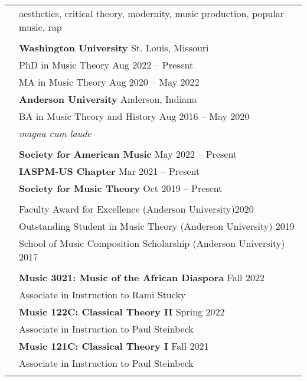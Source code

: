\documentclass[letterpaper, 11pt]{article}
\begin{document}
\begin{longtable}{p{1.3in}p{4.8in}}

\nohyphens{\color{OliveGreen}{Research interests}}
& aesthetics, critical theory, modernity, music production, popular music, rap \\
& \\

\color{OliveGreen}{Education} 
& \textbf{Washington University} \hfill St. Louis, Missouri \\
& PhD in Music Theory \hfill Aug 2022 -- Present \\
& MA in Music Theory \hfill Aug 2020 -- May 2022\\

& \textbf{Anderson University} \hfill Anderson, Indiana \\
& BA in Music Theory and History \hfill Aug 2016 -- May 2020 \\
& {\it magna cum laude}\\
&\\

{\color{OliveGreen}{Memberships}} 
& \textbf{Society for American Music} \hfill May 2022 -- Present \\
& \textbf{IASPM-US Chapter} \hfill Mar 2021 -- Present \\
& \textbf{Society for Music Theory} \hfill Oct 2019 -- Present \\
& \\

{\color{OliveGreen}{Honors \&}}
& Faculty Award for Excellence (Anderson University)\hfill 2020 \\
{\color{OliveGreen}{Scholarships}} 
& Outstanding Student in Music Theory (Anderson University) \hfill 2019 \\
& School of Music Composition Scholarship (Anderson University) \hfill 2017\\
& \\

{\color{OliveGreen}{Courses Taught}} 
& \textbf{Music 3021: Music of the African Diaspora} \hfill Fall 2022 \\
& Associate in Instruction to Rami Stucky \\
& \textbf{Music 122C: Classical Theory II} \hfill Spring 2022 \\
& Associate in Instruction to Paul Steinbeck \\
& \textbf{Music 121C: Classical Theory I} \hfill Fall 2021 \\
& Associate in Instruction to Paul Steinbeck \\
& \\



\end{longtable}
\end{document}
